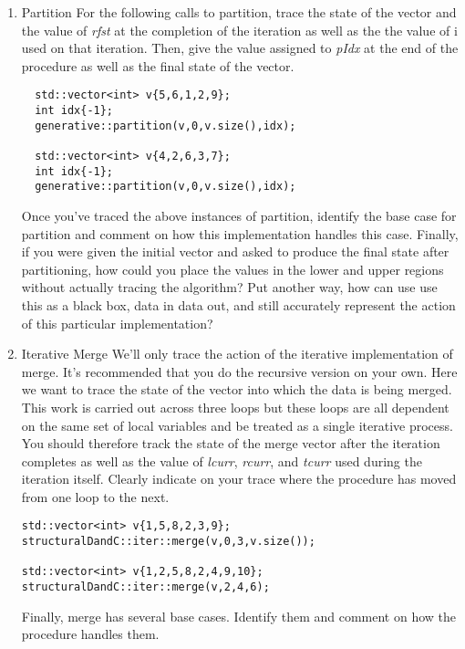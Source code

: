 \documentclass[10pt]{article}
\begin{document}
\begin{enumerate}
\newpage \thispagestyle{empty}
\hspace{1in}
\newpage \thispagestyle{empty}

\item Partition \newline
For the following calls to partition, trace the state of the vector and the value of \textit{rfst} at the completion of the iteration as well as the the value of i used on that iteration. Then, give the value assigned to \textit{pIdx} at the end of the procedure as well as the final state of the vector.
\begin{lstlisting}
  std::vector<int> v{5,6,1,2,9};
  int idx{-1};
  generative::partition(v,0,v.size(),idx);

  std::vector<int> v{4,2,6,3,7};
  int idx{-1};
  generative::partition(v,0,v.size(),idx);
\end{lstlisting}
Once you've traced the above instances of partition, identify the base case for partition and comment on how this implementation handles this case. Finally, if you were given the initial vector and asked to produce the final state after partitioning, how could you place the values in the lower and upper regions without actually tracing the algorithm? Put another way, how can use use this as a black box, data in data out, and still accurately represent the action of this particular implementation?

\newpage \thispagestyle{empty}
\hspace{1in}
\newpage \thispagestyle{empty}

\item Iterative Merge \newline
We'll only trace the action of the iterative implementation of merge. It's recommended that you do the recursive version on your own. Here we want to trace the state of the vector into which the data is being merged. This work is carried out across three loops but these loops are all dependent on the same set of local variables and be treated as a single iterative process. You should therefore track the state of the merge vector  after the iteration completes as well as the value of \textit{lcurr}, \textit{rcurr}, and \textit{tcurr} used during the iteration itself. Clearly indicate on your trace where the procedure has moved from one loop to the next.
\begin{lstlisting}
std::vector<int> v{1,5,8,2,3,9};
structuralDandC::iter::merge(v,0,3,v.size());

std::vector<int> v{1,2,5,8,2,4,9,10};
structuralDandC::iter::merge(v,2,4,6);
\end{lstlisting}
Finally, merge has several base cases. Identify them and comment on how the procedure handles them.

\newpage \thispagestyle{empty}
\hspace{1in}
\newpage \thispagestyle{empty}

\end{enumerate}
\end{document}
